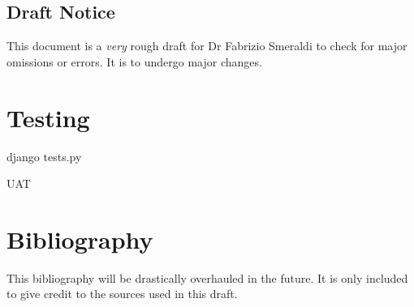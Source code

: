 \documentclass[12pt, a4paper]{article}
\begin{document}


\newpage
\subsection{Draft Notice}
This document is a \textit{very} rough draft for Dr Fabrizio Smeraldi to check for major omissions or errors. It is to undergo major changes.

\newpage

\newpage


\newpage
\tableofcontents

\restoregeometry

\newpage


\newpage


\newpage


\newpage


\section{Testing}
django tests.py

UAT
\newpage




\section{Bibliography}
This bibliography will be drastically overhauled in the future. It is only included to give credit to the sources used in this draft.
\end{document}
